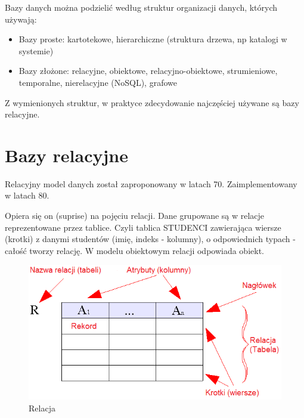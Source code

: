 \documentclass[]{report}
\begin{document}
Bazy danych można podzielić według struktur organizacji danych, których używają:

\begin{itemize}
\item Bazy proste: kartotekowe, hierarchiczne (struktura drzewa, np katalogi w systemie)
\item Bazy złożone: relacyjne, obiektowe, relacyjno-obiektowe, strumieniowe, temporalne, nierelacyjne (NoSQL), grafowe
\end{itemize}

Z wymienionych struktur, w praktyce zdecydowanie najczęściej używane są bazy relacyjne.
\medskip


\section{Bazy relacyjne}
Relacyjny model danych został zaproponowany w latach 70. Zaimplementowany w latach 80. 

Opiera się on (suprise) na pojęciu relacji. Dane grupowane są w relacje reprezentowane przez tablice. Czyli tablica STUDENCI zawierająca wiersze (krotki) z danymi studentów (imię, indeks - kolumny), o odpowiednich typach - całość tworzy relację.
W modelu obiektowym relacji odpowiada obiekt. \\

\begin{figure}[htbp]
	\centering
	\includegraphics[scale=0.7]{obrazy/bazy/Relational_model_concepts_PL.png}
	\caption{Relacja}
\end{figure}
\end{document}
